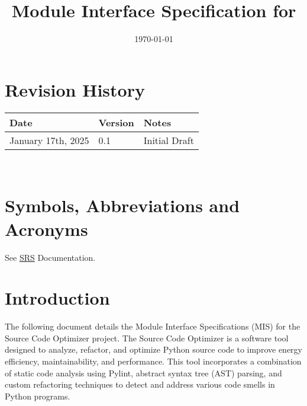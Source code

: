 \documentclass[12pt, titlepage]{article}
\begin{document}
\title{Module Interface Specification for \progname{}}

\author{\authname}

\date{\today}

\maketitle


\section{Revision History}

\begin{tabularx}{\textwidth}{p{3cm}p{2cm}X}
\toprule {\bf Date} & {\bf Version} & {\bf Notes}\\
\midrule
January 17th, 2025 & 0.1 & Initial Draft\\
\bottomrule
\end{tabularx}

~\newpage

\section{Symbols, Abbreviations and Acronyms}

See \href{https://github.com/ssm-lab/capstone--source-code-optimizer/blob/main/docs/SRS/SRS.pdf}{SRS} Documentation.


\newpage

\tableofcontents

\newpage


\section{Introduction}

The following document details the Module Interface Specifications (MIS) for the Source Code Optimizer project. The Source Code Optimizer is a software tool designed to analyze, refactor, and optimize Python source code to improve energy efficiency, maintainability, and performance. This tool incorporates a combination of static code analysis using Pylint, abstract syntax tree (AST) parsing, and custom refactoring techniques to detect and address various code smells in Python programs.
\end{document}
